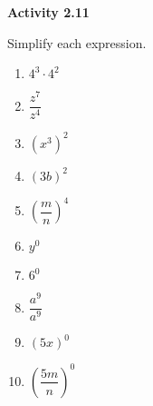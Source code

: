 \vspace{1ex}
\noindent\textbf{Activity 2.11}

\vspace{0.75ex}

Simplify each expression.

\begin{multicols}{2}
\begin{enumerate}[noitemsep, label = \color{blue}\arabic*. ]
    \item \( 4^3 \cdot 4^2 \)
    \item \( \dfrac{z^7}{z^4} \)
    \item \( (x^3)^2 \)
    \item \( (3b)^2 \)
    \item \( \left( \dfrac{m}{n} \right)^4 \)
    \item \( y^0 \)
    \item \( 6^0 \)
    \item \( \dfrac{a^9}{a^9} \)
    \item \( (5x)^0 \)
    \item \( \left( \dfrac{5m}{n} \right)^0 \)
\end{enumerate}
\end{multicols}
